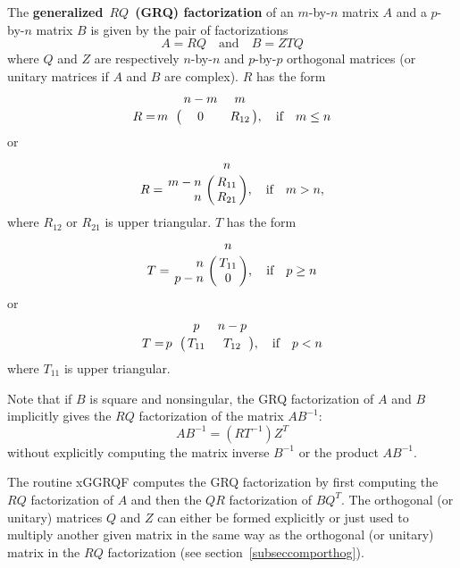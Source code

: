 The {\bf generalized}~{\boldmath $RQ$}~{\bf (GRQ) factorization} of an $m$-by-$n$ matrix $A$ and
a $p$-by-$n$ matrix $B$ is given by the pair of factorizations
\[
A = R Q \quad \mbox{and} \quad B = Z T Q
\]
where $Q$ and $Z$ are respectively $n$-by-$n$ and $p$-by-$p$ orthogonal
matrices (or unitary matrices if $A$ and $B$ are complex).
$R$ has the form
\[
R = \bordermatrix{    & n-m    &   m    \cr
                  m   & 0      &  R_{12}  }, \quad \mbox{if} \quad m \leq n
\]
or
\[
R = \bordermatrix{    & n   \cr
                  m-n & R_{11} \cr
         \hfill   n   & R_{21} },   \quad \mbox{if} \quad m > n,
\]
where $R_{12}$ or $R_{21}$ is upper triangular. $T$ has the form
\[
T = \bordermatrix{    & n   \cr
         \hfill   n   & T_{11} \cr
                  p-n & 0      }, \quad \mbox{if} \quad p \geq n
\]
or
\[
T = \bordermatrix{    & p      &  n-p    \cr
                  p   & T_{11} &  T_{12} }, \quad \mbox{if} \quad p < n
\]
where $T_{11}$  is upper triangular.

Note that if $B$ is square and nonsingular, the GRQ factorization of
$A$ and $B$ implicitly gives the $RQ$ factorization of the matrix $AB^{-1}$:
\[
A B^{-1} = ( R T^{-1} ) Z^T
\]
without explicitly computing the matrix inverse $B^{-1}$ or the product
$AB^{-1}$.

The routine xGGRQF computes the GRQ factorization
by first computing the $RQ$ factorization of $A$ and then
the $QR$ factorization of $BQ^T$.
The orthogonal (or unitary) matrices $Q$ and $Z$
can either be formed explicitly or
just used to multiply another given matrix in the same way as the
orthogonal (or unitary) matrix
in the $RQ$ factorization
(see section~\ref{subseccomporthog}).

